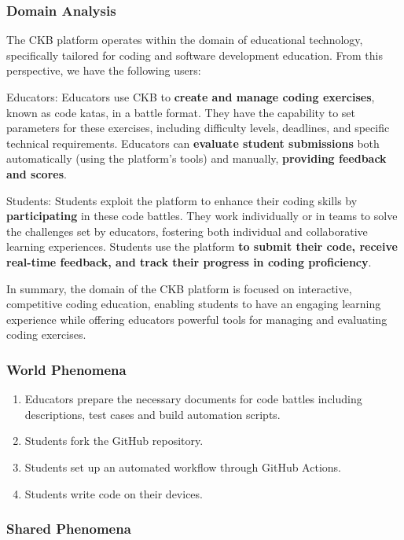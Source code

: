 \subsubsection{Domain Analysis}
The CKB platform operates within the domain of educational technology, specifically tailored for coding and software development education. From this perspective, we have the following users:

Educators:
Educators use CKB to \textbf{create and manage coding exercises}, known as code katas, in a battle format. They have the capability to set parameters for these exercises, including difficulty levels, deadlines, and specific technical requirements. Educators can \textbf{evaluate student submissions} both automatically (using the platform's tools) and manually, \textbf{providing feedback and scores}.

Students:
Students exploit the platform to enhance their coding skills by \textbf{participating} in these code battles. They work individually or in teams to solve the challenges set by educators, fostering both individual and collaborative learning experiences. Students use the platform \textbf{to submit their code, receive real-time feedback, and track their progress in coding proficiency}.

In summary, the domain of the CKB platform is focused on interactive, competitive coding education, enabling students to have an engaging learning experience while offering educators powerful tools for managing and evaluating coding exercises.

\subsubsection{World Phenomena}

\begin{enumerate}
    \item Educators prepare the necessary documents for code battles including descriptions, test cases and build automation scripts.
    \item Students fork the GitHub repository.
    \item Students set up an automated workflow through GitHub Actions.
    \item Students write code on their devices.
\end{enumerate}

\subsubsection{Shared Phenomena}


